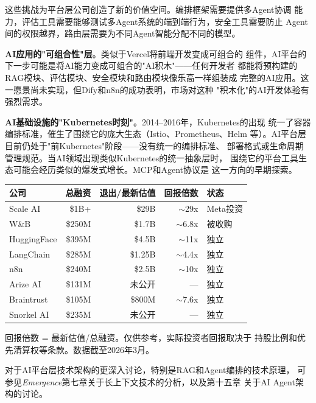 这些挑战为平台层公司创造了新的价值空间。编排框架需要提供多Agent协调
能力，评估工具需要能够测试多Agent系统的端到端行为，安全工具需要防止
Agent间的权限越界，路由层需要为不同Agent智能分配不同的模型。

\textbf{AI应用的"可组合性"层}。类似于Vercel将前端开发变成可组合的
组件，AI平台的下一步可能是将AI能力变成可组合的"AI积木"——任何开发者
都能将预构建的RAG模块、评估模块、安全模块和路由模块像乐高一样组装成
完整的AI应用。这一愿景尚未实现，但Dify和n8n的成功表明，市场对这种
"积木化"的AI开发体验有强烈需求。

\textbf{AI基础设施的"Kubernetes时刻"}。2014--2016年，Kubernetes的出现
统一了容器编排标准，催生了围绕它的庞大生态（Istio、Prometheus、Helm
等）。AI平台层目前仍处于"前Kubernetes"阶段——没有统一的编排标准、
部署格式或生命周期管理规范。当AI领域出现类似Kubernetes的统一抽象层时，
围绕它的平台工具生态可能会经历类似的爆发式增长。MCP和Agent协议是
这一方向的早期探索。

\begin{keybox}
\small
\begin{tabularx}{\textwidth}{l r r r l}
\toprule
\rowcolor{figLightGray}
\textbf{公司} & \textbf{总融资} & \textbf{退出/最新估值} & \textbf{回报倍数} & \textbf{状态} \\
\midrule
Scale AI        & \$1B+   & \$29B    & $\sim$29x  & Meta投资 \\
W\&B            & \$250M  & \$1.7B   & $\sim$6.8x & 被收购 \\
HuggingFace     & \$395M  & \$4.5B   & $\sim$11x  & 独立 \\
LangChain       & \$285M  & \$1.25B  & $\sim$4.4x & 独立 \\
n8n             & \$240M  & \$2.5B   & $\sim$10x  & 独立 \\
Arize AI        & \$131M  & 未公开   & ---        & 独立 \\
Braintrust      & \$105M  & \$800M   & $\sim$7.6x & 独立 \\
Snorkel AI      & \$235M  & 未公开   & ---        & 独立 \\
\bottomrule
\end{tabularx}

\medskip
\noindent 回报倍数 = 最新估值/总融资。仅供参考，实际投资者回报取决于
持股比例和优先清算权等条款。数据截至2026年3月。
\end{keybox}

对于AI平台层技术架构的更深入讨论，特别是RAG和Agent编排的技术原理，
可参见\textit{Emergence}第七章关于长上下文技术的分析，以及第十五章
关于AI Agent架构的讨论。

